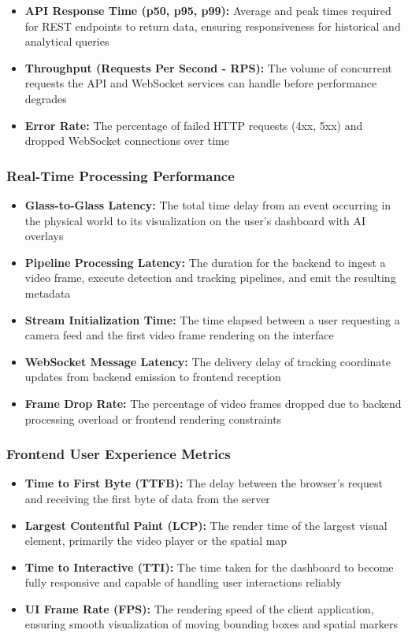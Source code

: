 \begin{itemize}
    \item \textbf{API Response Time (p50, p95, p99):} Average and peak times required for REST endpoints to return data, ensuring responsiveness for historical and analytical queries
    \item \textbf{Throughput (Requests Per Second - RPS):} The volume of concurrent requests the API and WebSocket services can handle before performance degrades
    \item \textbf{Error Rate:} The percentage of failed HTTP requests (4xx, 5xx) and dropped WebSocket connections over time
\end{itemize}

\subsubsection{Real-Time Processing Performance}
\label{subsubsection:real-time-performance}

\begin{itemize}
    \item \textbf{Glass-to-Glass Latency:} The total time delay from an event occurring in the physical world to its visualization on the user's dashboard with AI overlays
    \item \textbf{Pipeline Processing Latency:} The duration for the backend to ingest a video frame, execute detection and tracking pipelines, and emit the resulting metadata
    \item \textbf{Stream Initialization Time:} The time elapsed between a user requesting a camera feed and the first video frame rendering on the interface
    \item \textbf{WebSocket Message Latency:} The delivery delay of tracking coordinate updates from backend emission to frontend reception
    \item \textbf{Frame Drop Rate:} The percentage of video frames dropped due to backend processing overload or frontend rendering constraints
\end{itemize}

\subsubsection{Frontend User Experience Metrics}
\label{subsubsection:frontend-ux-metrics}

\begin{itemize}
    \item \textbf{Time to First Byte (TTFB):} The delay between the browser's request and receiving the first byte of data from the server
    \item \textbf{Largest Contentful Paint (LCP):} The render time of the largest visual element, primarily the video player or the spatial map
    \item \textbf{Time to Interactive (TTI):} The time taken for the dashboard to become fully responsive and capable of handling user interactions reliably
    \item \textbf{UI Frame Rate (FPS):} The rendering speed of the client application, ensuring smooth visualization of moving bounding boxes and spatial markers
\end{itemize}


